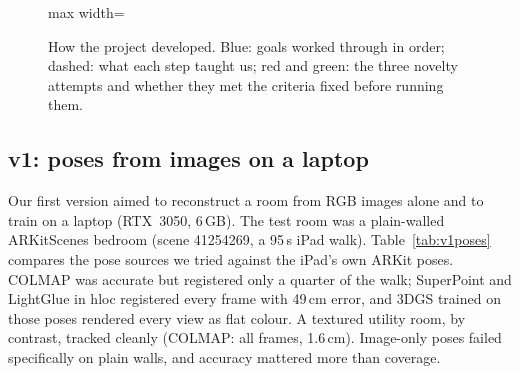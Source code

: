 \begin{figure}[!htb]
\begin{adjustbox}{max width=\linewidth}
\end{adjustbox}
\caption{How the project developed. Blue: goals worked through in order; dashed: what each step taught us; red and green: the three novelty attempts and whether they met the criteria fixed before running them.}
\label{fig:journey}
\end{figure}

\subsection{v1: poses from images on a laptop}
Our first version aimed to reconstruct a room from RGB images alone and to train on a laptop (RTX~3050, 6\,GB). The test room was a plain-walled ARKitScenes \cite{baruch2021arkitscenes} bedroom (scene 41254269, a 95\,s iPad walk). Table~\ref{tab:v1poses} compares the pose sources we tried against the iPad's own ARKit poses. COLMAP \cite{schoenberger2016colmap} was accurate but registered only a quarter of the walk; SuperPoint \cite{detone2018superpoint} and LightGlue \cite{lindenberger2023lightglue} in hloc \cite{sarlin2019hloc} registered every frame with 49\,cm error, and 3DGS trained on those poses rendered every view as flat colour. A textured utility room, by contrast, tracked cleanly (COLMAP: all frames, 1.6\,cm). Image-only poses failed specifically on plain walls, and accuracy mattered more than coverage.

